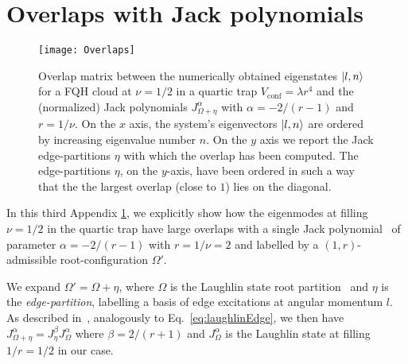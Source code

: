 \documentclass[twocolumn,pra,superscriptaddress,noshowpacs]{revtex4}
\begin{document}
\section{Overlaps with Jack polynomials}\label{appendix:Jacks}
\begin{figure}[htbp]
   	\begin{adjustbox}{width=.5\textwidth, totalheight=\baselineskip,keepaspectratio,right}
      	\texttt{[image: Overlaps]}
    \end{adjustbox}
    \vspace{0.0cm}\caption{
    Overlap matrix between the numerically obtained eigenstates $\ket{l,n}$ for a FQH cloud at $\nu=1/2$ in a quartic trap $V_\text{conf}=\lambda r^4$ and the (normalized) Jack polynomials $J_{\Omega+\eta}^{\alpha}$ with $\alpha=-2/(r-1)$ and $r=1/\nu$. 
     On the $x$ axis, the system's eigenvectors $\ket{l,n}$ are ordered by increasing eigenvalue number $n$. 
     On the $y$ axis we report the Jack edge-partitions $\eta$ with which the overlap has been computed. The edge-partitions $\eta$, on the $y$-axis, have been ordered in such a way that the the largest overlap (close to $1$) lies on the diagonal.
    \label{fig:quarticTrapJacksOverlaps}}
\end{figure}

In this third Appendix \ref{appendix:Jacks}, we explicitly show how the eigenmodes at filling $\nu=1/2$ in the quartic trap have large overlaps with a single Jack polynomial~\cite{LeeHuWan_PRB_2014,Macaluso_PRA_2017,Macaluso_PRA_2018} of parameter $\alpha=-2/(r-1)$ with $r=1/\nu=2$ and labelled by a $(1,r)$-admissible root-configuration $\Omega'$. 

We expand $\Omega' = \Omega+\eta$, where $\Omega$ is the Laughlin state root partition~\cite{BernevigHaldane_PRL_2008} and $\eta$ is the \textit{edge-partition}, labelling a basis of edge excitations at angular momentum $l$. As described in~\cite{LeeHuWan_PRB_2014}, analogously to Eq.~\eqref{eq:laughlinEdge}, we then have $J_{\Omega+\eta}^{\alpha}=J_{\eta}^{\beta}J_{\Omega}^{\alpha}$ where $\beta=2/(r+1)$ and $J_{\Omega}^{\alpha}$ is the Laughlin state at filling $1/r=1/2$ in our case.
\end{document}
